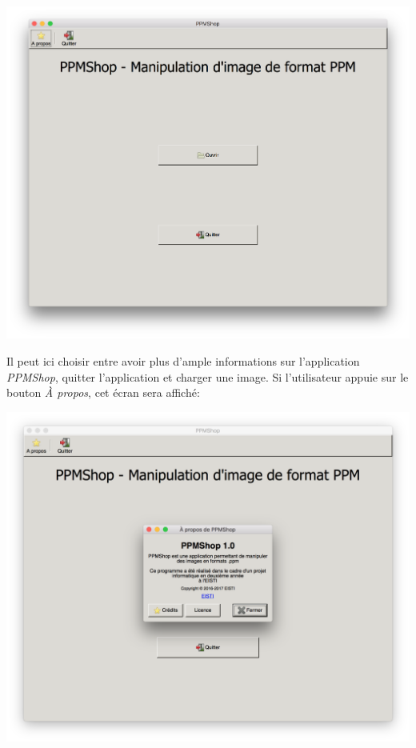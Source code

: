 \documentclass[12pt]{article}
\begin{document}
\begin{center}
\includegraphics[scale = 0.4]{firstScreen}\\
\end{center}

Il peut ici choisir entre avoir plus d'ample informations sur l'application \textit{PPMShop}, quitter l'application et charger une image.
Si l'utilisateur appuie sur le bouton \textit{À propos}, cet écran sera affiché: 

\begin{center}
\includegraphics[scale = 0.4]{aboutScreen}\\
\end{center}
\end{document}
